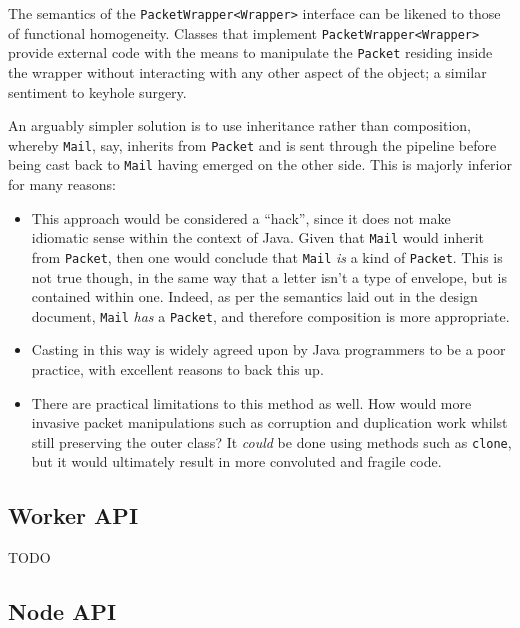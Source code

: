 The semantics of the \texttt{PacketWrapper<Wrapper>} interface can be likened to those of functional
homogeneity\cite{homogeneous_function}. Classes that implement \texttt{PacketWrapper<Wrapper>} provide external code
with the means to manipulate the \texttt{Packet} residing inside the wrapper without interacting with any other
aspect of the object; a similar sentiment to keyhole surgery\cite{keyhole_surgery}.

An arguably simpler solution is to use inheritance rather than composition, whereby \texttt{Mail}, say, inherits from
\texttt{Packet} and is sent through the pipeline before being cast back to \texttt{Mail} having emerged on the other
side. This is majorly inferior for many reasons:
\begin{itemize}
    \item This approach would be considered a ``hack'', since it does not make idiomatic sense within the context of
    Java. Given that \texttt{Mail} would inherit from \texttt{Packet}, then one would conclude that \texttt{Mail}
    \emph{is} a kind of \texttt{Packet}. This is not true though, in the same way that a letter isn't a type of
    envelope, but is contained within one. Indeed, as per the semantics laid out in the design document,
    \texttt{Mail} \emph{has} a \texttt{Packet}, and therefore composition is more appropriate.
    \item Casting in this way is widely agreed upon by Java programmers to be a poor practice, with excellent reasons
    to back this up\cite{reddit_casting, yegor_bugayenko_casting, mark_casting, dennis_sosnoski_casting,
        erik_dietrich_casting}.
    \item There are practical limitations to this method as well. How would more invasive packet manipulations such
    as corruption and duplication work whilst still preserving the outer class? It \emph{could} be done using
    methods such as \texttt{clone}\cite{java_clone}, but it would ultimately result in more convoluted and fragile
    code\cite{java_avoid_clone}.
\end{itemize}

\subsection{Worker API}

TODO

\subsection{Node API}

